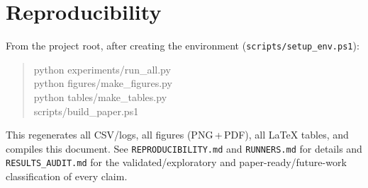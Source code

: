 \documentclass[11pt]{article}
\newcommand{\code}[1]{\texttt{#1}}
\begin{document}
\section{Reproducibility}\label{app:repro}
From the project root, after creating the environment
(\code{scripts/setup\_env.ps1}):
\begin{quote}\small\ttfamily
python experiments/run\_all.py\\
python figures/make\_figures.py\\
python tables/make\_tables.py\\
scripts/build\_paper.ps1
\end{quote}
This regenerates all CSV/logs, all figures (PNG\,+\,PDF), all LaTeX tables, and
compiles this document. See \code{REPRODUCIBILITY.md} and \code{RUNNERS.md} for
details and \code{RESULTS\_AUDIT.md} for the validated/exploratory and
paper-ready/future-work classification of every claim.



\end{document}
